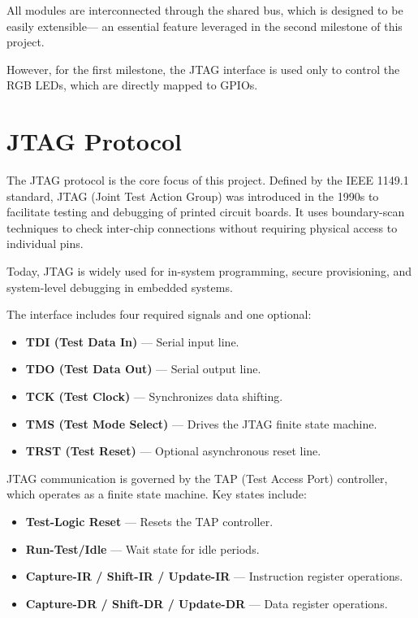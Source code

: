\documentclass[a4paper,11pt,oneside]{report}
\begin{document}
All modules are interconnected through the shared bus,  
which is designed to be easily extensible—  
an essential feature leveraged in the second milestone of this project.  

However, for the first milestone,  
the JTAG interface is used only to control the RGB LEDs,  
which are directly mapped to GPIOs.  

\section{JTAG Protocol}
\label{sec:JTAG}

The JTAG protocol is the core focus of this project.  
Defined by the IEEE 1149.1 standard,  
JTAG (Joint Test Action Group) was introduced in the 1990s  
to facilitate testing and debugging of printed circuit boards.  
It uses boundary-scan techniques to check inter-chip connections  
without requiring physical access to individual pins.  

Today, JTAG is widely used for in-system programming, secure provisioning,  
and system-level debugging in embedded systems.  

The interface includes four required signals and one optional:  

\begin{itemize}
    \item \textbf{TDI (Test Data In)} — Serial input line.  
    \item \textbf{TDO (Test Data Out)} — Serial output line.  
    \item \textbf{TCK (Test Clock)} — Synchronizes data shifting.  
    \item \textbf{TMS (Test Mode Select)} — Drives the JTAG finite state machine.  
    \item \textbf{TRST (Test Reset)} — Optional asynchronous reset line.  
\end{itemize}

JTAG communication is governed by the TAP (Test Access Port) controller,  
which operates as a finite state machine.  
Key states include:  

\begin{itemize}
    \item \textbf{Test-Logic Reset} — Resets the TAP controller.  
    \item \textbf{Run-Test/Idle} — Wait state for idle periods.  
    \item \textbf{Capture-IR / Shift-IR / Update-IR} — Instruction register operations.  
    \item \textbf{Capture-DR / Shift-DR / Update-DR} — Data register operations.  
\end{itemize}
\end{document}
